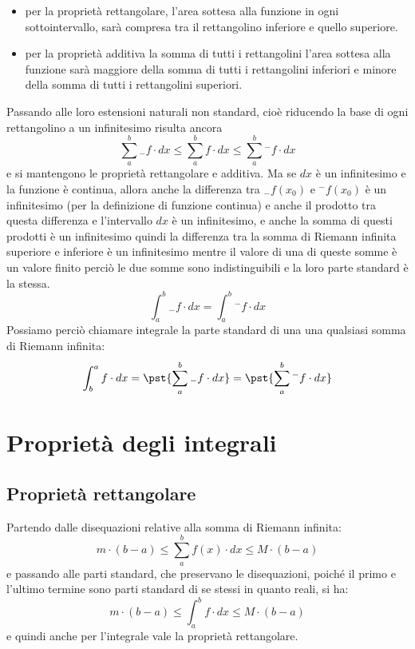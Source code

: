 \begin{itemize} [nosep]
 \item per la proprietà rettangolare, l'area sottesa alla funzione in ogni 
sottointervallo, sarà compresa tra il rettangolino inferiore e quello 
superiore.
 \item per la proprietà additiva la somma di tutti i rettangolini l'area 
sottesa alla funzione sarà maggiore della somma di tutti i rettangolini 
inferiori e minore della somma di tutti i rettangolini superiori.
\end{itemize}

  Passando alle loro estensioni naturali non standard, cioè riducendo la base 
di ogni rettangolino a un infinitesimo risulta ancora 
\[\sum_a^b {}_{-}f \cdot dx \le \sum_a^b f \cdot dx \le 
  \sum_a^b {}^{-}f \cdot dx\] 
e si mantengono le proprietà rettangolare e additiva. 
Ma se \(dx\) è un infinitesimo e la funzione è continua, allora anche la 
differenza tra \({}_{-}f(x_0)\) e \({}^{-}f(x_0)\) è un infinitesimo (per la 
definizione di funzione continua) e anche il prodotto tra questa differenza e 
l'intervallo \(dx\) è un infinitesimo, e anche la somma di questi prodotti è 
un infinitesimo quindi la differenza tra la somma di Riemann infinita 
superiore e inferiore è un infinitesimo mentre il valore di una di queste 
somme è un valore finito perciò le due somme sono indistinguibili e la loro 
parte standard è la stessa.
\[\int_a^b {}_{-}f \cdot dx = \int_a^b {}^{-}f \cdot dx\]
Possiamo perciò chiamare integrale la parte standard di una una qualsiasi 
somma di Riemann infinita:
\[\int_b^a f \cdot dx = \pst{\sum_a^b {}_{-}f \cdot dx} =
                        \pst{\sum_a^b {}^{-}f \cdot dx}\]

\section{Proprietà degli integrali}
\label{sec:integrali_proprieta}

\subsection{Proprietà rettangolare}
\label{subsec:integrali_proprieta_rettangolare}

Partendo dalle disequazioni relative alla somma di Riemann infinita:
\[m \cdot (b - a) \le  \sum_a^b f(x) \cdot dx  \le M\cdot(b - a)\]
e passando alle parti standard, che 
preservano le disequazioni, poiché il primo e l'ultimo termine sono parti 
standard di se stessi in quanto reali, si ha: 
\[m \cdot(b - a) \le  \int_a^b f \cdot dx  \le M\cdot(b - a)\] 
e quindi anche per l'integrale vale la proprietà rettangolare.


